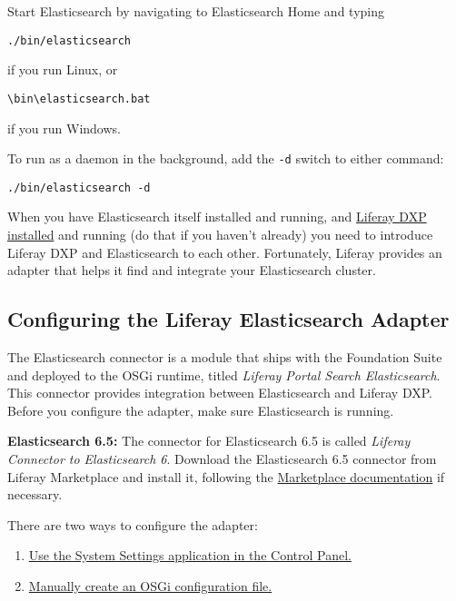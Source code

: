 Start Elasticsearch by navigating to Elasticsearch Home and typing

\begin{verbatim}
./bin/elasticsearch
\end{verbatim}

if you run Linux, or

\begin{verbatim}
\bin\elasticsearch.bat
\end{verbatim}

if you run Windows.

To run as a daemon in the background, add the \texttt{-d} switch to
either command:

\begin{verbatim}
./bin/elasticsearch -d
\end{verbatim}

When you have Elasticsearch itself installed and running, and
\href{/docs/7-0/deploy/-/knowledge_base/d/preparing-for-install}{Liferay
DXP installed} and running (do that if you haven't already) you need to
introduce Liferay DXP and Elasticsearch to each other. Fortunately,
Liferay provides an adapter that helps it find and integrate your
Elasticsearch cluster.

\subsection{Configuring the Liferay Elasticsearch
Adapter}\label{configuring-the-liferay-elasticsearch-adapter}

The Elasticsearch connector is a module that ships with the Foundation
Suite and deployed to the OSGi runtime, titled \emph{Liferay Portal
Search Elasticsearch}. This connector provides integration between
Elasticsearch and Liferay DXP. Before you configure the adapter, make
sure Elasticsearch is running.

\noindent\hrulefill

\textbf{Elasticsearch 6.5:} The connector for Elasticsearch 6.5 is
called \emph{Liferay Connector to Elasticsearch 6}. Download the
Elasticsearch 6.5 connector from Liferay Marketplace and install it,
following the
\href{/docs/7-0/user/-/knowledge_base/u/using-the-liferay-marketplace}{Marketplace
documentation} if necessary.

\noindent\hrulefill

There are two ways to configure the adapter:

\begin{enumerate}
\def\labelenumi{\arabic{enumi}.}
\item
  \hyperref[configuring-the-adapter-in-the-control-panel]{Use the System
  Settings application in the Control Panel.}
\item
  \hyperref[configuring-the-adapter-with-an-osgi-config-file]{Manually
  create an OSGi configuration file.}
\end{enumerate}

